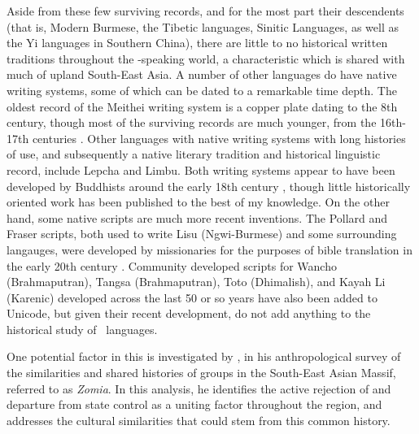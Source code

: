 {Aside from these few surviving records, and for the most part their descendents (that is, Modern Burmese, the Tibetic languages, Sinitic Languages, as well as the Yi languages in Southern China), there are little to no historical written traditions throughout the \lfam-speaking world, a characteristic which is shared with much of upland South-East Asia. A number of other languages do have native writing systems, some of which can be dated to a remarkable time depth. The oldest record of the Meithei writing system is a copper plate dating to the 8th century, though most of the surviving records are much younger, from the 16th-17th centuries \cite{Chelliah2000}. Other languages with native writing systems with long histories of use, and subsequently a native literary tradition and historical linguistic record, include Lepcha and Limbu. Both writing systems appear to have been developed by Buddhists around the early 18th century \cite{Plaisier2007}, though little historically oriented work has been published to the best of my knowledge. On the other hand, some native scripts are much more recent inventions. The Pollard and Fraser scripts, both used to write Lisu (Ngwi-Burmese) and some surrounding langauges, were developed by missionaries for the purposes of bible translation in the early 20th century \cite{Bradley2017}. Community developed scripts for Wancho (Brahmaputran), Tangsa (Brahmaputran), Toto (Dhimalish), and Kayah Li (Karenic) developed across the last 50 or so years have also been added to Unicode, but given their recent development, do not add anything to the historical study of \lfam\ languages.

One potential factor in this is investigated by , in his anthropological survey of the similarities and shared histories of groups in the South-East Asian Massif, referred to as \textit{Zomia}. In this analysis, he identifies the active rejection of and departure from state control as a uniting factor throughout the region, and addresses the cultural similarities that could stem from this common history.

}
